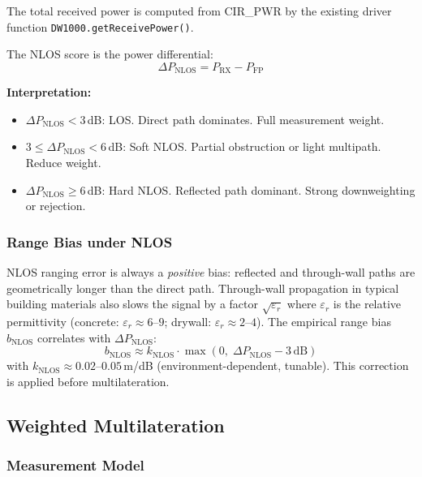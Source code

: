 \documentclass[11pt,a4paper]{article}
\begin{document}
The total received power is computed from CIR\_PWR by the existing driver function \texttt{DW1000.getReceivePower()}.

The NLOS score is the power differential:
\begin{equation}
\boxed{
\Delta P_\text{NLOS} = P_\text{RX} - P_\text{FP}
}
\label{eq:nlos}
\end{equation}

\textbf{Interpretation:}
\begin{itemize}[leftmargin=2em]
  \item $\Delta P_\text{NLOS} < 3$\,dB: LOS. Direct path dominates. Full measurement weight.
  \item $3 \leq \Delta P_\text{NLOS} < 6$\,dB: Soft NLOS. Partial obstruction or light multipath. Reduce weight.
  \item $\Delta P_\text{NLOS} \geq 6$\,dB: Hard NLOS. Reflected path dominant. Strong downweighting or rejection.
\end{itemize}

\subsubsection{Range Bias under NLOS}

NLOS ranging error is always a \emph{positive} bias: reflected and through-wall paths are geometrically longer than the direct path. Through-wall propagation in typical building materials also slows the signal by a factor $\sqrt{\varepsilon_r}$ where $\varepsilon_r$ is the relative permittivity (concrete: $\varepsilon_r \approx 6$--$9$; drywall: $\varepsilon_r \approx 2$--$4$). The empirical range bias $b_\text{NLOS}$ correlates with $\Delta P_\text{NLOS}$:
\begin{equation}
b_\text{NLOS} \approx k_\text{NLOS} \cdot \max(0,\; \Delta P_\text{NLOS} - 3\,\text{dB})
\label{eq:biasnlos}
\end{equation}
with $k_\text{NLOS} \approx 0.02$--$0.05$\,m/dB (environment-dependent, tunable). This correction is applied before multilateration.

\subsection{Weighted Multilateration}

\subsubsection{Measurement Model}
\end{document}
